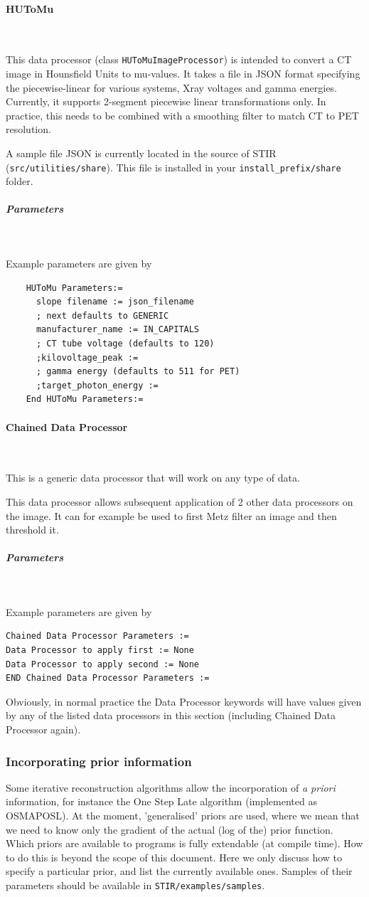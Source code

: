 \documentclass{article}
\newcommand{\subsubsubsection}[1]{\paragraph{#1}\mbox{} \\}
\newcommand{\subsubsubsubsection}[1]{\subparagraph{#1} \mbox{} \\}
\begin{document}
{{{ \subsubsubsection{HUToMu}
}

This data processor (class \texttt{HUToMuImageProcessor}) is intended to convert a CT image in Hounsfield Units to mu-values.
It takes a file in JSON format specifying the piecewise-linear for various systems, Xray voltages and gamma energies.
Currently, it supports 2-segment piecewise linear transformations only.
In practice, this needs to be combined with a smoothing filter to match CT to PET resolution.

A sample file JSON is currently located in the source of STIR (\texttt{src/utilities/share}).
This file is installed in your \texttt{install\_prefix/share} folder.

{ \subsubsubsubsection{Parameters}
}
Example parameters are given by
\begin{verbatim}
    HUToMu Parameters:=
      slope filename := json_filename
      ; next defaults to GENERIC
      manufacturer_name := IN_CAPITALS
      ; CT tube voltage (defaults to 120)
      ;kilovoltage_peak :=
      ; gamma energy (defaults to 511 for PET)
      ;target_photon_energy :=
    End HUToMu Parameters:=
\end{verbatim}

{ \subsubsubsection{Chained Data Processor}
}
This is a generic data processor that will work on any type of data.

This data processor allows subsequent application of 2 other 
data processors on the image. It can for example be used to 
first Metz filter an image and then threshold it.

{ \subsubsubsubsection{Parameters}
}
Example parameters are given by
\begin{verbatim}
Chained Data Processor Parameters :=
Data Processor to apply first := None
Data Processor to apply second := None
END Chained Data Processor Parameters :=
\end{verbatim}

Obviously, in normal practice the Data Processor keywords will 
have values given by any of the listed data processors in this 
section (including Chained Data Processor again).



\subsubsection{
Incorporating prior information}
\label{sec:priors}
Some iterative reconstruction algorithms allow the incorporation 
of \textit{a priori} information, for instance the One Step Late algorithm 
(implemented as OSMAPOSL). At the moment, 'generalised' priors 
are used, where we mean that we need to know only the gradient 
of the actual (log of the) prior function.\\
Which priors are available to programs is fully extendable (at 
compile time). How to do this is beyond the scope of this document. 
Here we only discuss how to specify a particular prior, and list 
the currently available ones. Samples of their parameters should 
be available in \texttt{STIR/examples/samples}.



}}
\end{document}
